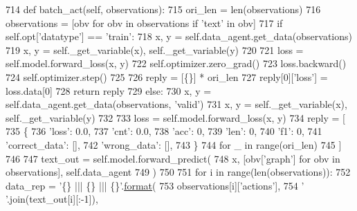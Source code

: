 \begin{DoxyCode}
714     \textcolor{keyword}{def }batch\_act(self, observations):
715         ori\_len = len(observations)
716         observations = [obv \textcolor{keywordflow}{for} obv \textcolor{keywordflow}{in} observations \textcolor{keywordflow}{if} \textcolor{stringliteral}{'text'} \textcolor{keywordflow}{in} obv]
717         \textcolor{keywordflow}{if} self.opt[\textcolor{stringliteral}{'datatype'}] == \textcolor{stringliteral}{'train'}:
718             x, y = self.data\_agent.get\_data(observations)
719             x, y = self.\_get\_variable(x), self.\_get\_variable(y)
720 
721             loss = self.model.forward\_loss(x, y)
722             self.optimizer.zero\_grad()
723             loss.backward()
724             self.optimizer.step()
725 
726             reply = [\{\}] * ori\_len
727             reply[0][\textcolor{stringliteral}{'loss'}] = loss.data[0]
728             \textcolor{keywordflow}{return} reply
729         \textcolor{keywordflow}{else}:
730             x, y = self.data\_agent.get\_data(observations, \textcolor{stringliteral}{'valid'})
731             x, y = self.\_get\_variable(x), self.\_get\_variable(y)
732 
733             loss = self.model.forward\_loss(x, y)
734             reply = [
735                 \{
736                     \textcolor{stringliteral}{'loss'}: 0.0,
737                     \textcolor{stringliteral}{'cnt'}: 0.0,
738                     \textcolor{stringliteral}{'acc'}: 0,
739                     \textcolor{stringliteral}{'len'}: 0,
740                     \textcolor{stringliteral}{'f1'}: 0,
741                     \textcolor{stringliteral}{'correct\_data'}: [],
742                     \textcolor{stringliteral}{'wrong\_data'}: [],
743                 \}
744                 \textcolor{keywordflow}{for} \_ \textcolor{keywordflow}{in} range(ori\_len)
745             ]
746 
747             text\_out = self.model.forward\_predict(
748                 x, [obv[\textcolor{stringliteral}{'graph'}] \textcolor{keywordflow}{for} obv \textcolor{keywordflow}{in} observations], self.data\_agent
749             )
750 
751             \textcolor{keywordflow}{for} i \textcolor{keywordflow}{in} range(len(observations)):
752                 data\_rep = \textcolor{stringliteral}{'\{\} ||| \{\} ||| \{\}'}.\hyperlink{namespaceparlai_1_1chat__service_1_1services_1_1messenger_1_1shared__utils_a32e2e2022b824fbaf80c747160b52a76}{format}(
753                     observations[i][\textcolor{stringliteral}{'actions'}],
754                     \textcolor{stringliteral}{' '}.join(text\_out[i][:-1]),

\end{DoxyCode}
